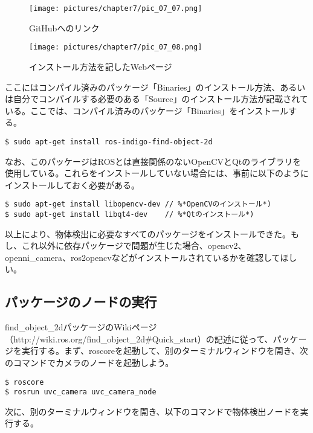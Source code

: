 \begin{figure}[htp]
  \centering
  \texttt{[image: pictures/chapter7/pic\_07\_07.png]}
  \caption{GitHubへのリンク}
\end{figure}

\begin{figure}[htp]
  \centering
  \texttt{[image: pictures/chapter7/pic\_07\_08.png]}
  \caption{インストール方法を記したWebページ}
\end{figure}

ここにはコンパイル済みのパッケージ「Binaries」のインストール方法、あるいは自分でコンパイルする必要のある「Source」のインストール方法が記載されている。ここでは、コンパイル済みのパッケージ「Binaries」をインストールする。

\begin{lstlisting}[language=ROS]
$ sudo apt-get install ros-indigo-find-object-2d
\end{lstlisting}

なお、このパッケージはROSとは直接関係のないOpenCVとQtのライブラリを使用している。これらをインストールしていない場合には、事前に以下のようにインストールしておく必要がある。

\begin{lstlisting}[language=ROS]
$ sudo apt-get install libopencv-dev // %*OpenCVのインストール*)
$ sudo apt-get install libqt4-dev    // %*Qtのインストール*)
\end{lstlisting}

以上により、物体検出に必要なすべてのパッケージをインストールできた。もし、これ以外に依存パッケージで問題が生じた場合、opencv2、openni\_camera、ros2opencvなどがインストールされているかを確認してほしい。

\subsection{パッケージのノードの実行}

find\_object\_2dパッケージのWikiページ（http://wiki.ros.org/find\_object\_2d\#Quick\_start）の記述に従って、パッケージを実行する。まず、roscoreを起動して、別のターミナルウィンドウを開き、次のコマンドでカメラのノードを起動しよう。

\begin{lstlisting}[language=ROS]
$ roscore
$ rosrun uvc_camera uvc_camera_node
\end{lstlisting}

次に、別のターミナルウィンドウを開き、以下のコマンドで物体検出ノードを実行する。

